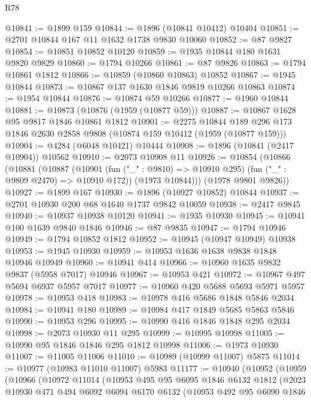 \begin{lexlean}{R78}
\begin{coremodule}
@10841 := @1899 @159
@10844 := @1896 (@10841 @10412) @10404
@10851 := @2701 @10844 @167 @11 @1632 @1738 @9830 @10060
@10852 := @87 @9827
@10854 := @10851 @10852 @10120
@10859 := @1935 @10844 @180 @1631 @9820 @9829
@10860 := @1794 @10266
@10861 := @87 @9826
@10863 := @1794 @10861 @1812
@10866 := @10859 (@10860 @10863) @10852
@10867 := @1945 @10844
@10873 := @10867 @137 @1630 @1846 @9819 @10266 @10863
@10874 := @1954 @10844
@10876 := @10874 @59 @10266
@10877 := @1960 @10844
@10881 := @10873 (@10876 (@1959 (@10877 @59)))
@10887 := @10867 @1628 @95 @9817 @1846 @10861 @1812
@10901 := @2275
    @10844
    @189
    @296
    @173
    @1846
    @2630
    @2858
    @9808
    (@10874 @159 @10412 (@1959 (@10877 @159)))
@10904 := @4284 (@6048 @10421) @10444
@10908 := @1896 (@10841 (@2417 @10904)) @10562
@10910 := @2073 @10908 @11
@10926 := @10854
    (@10866
      (@10881
        (@10887
          (@10901 (fun ("_" : @9810) => @10910 @295) (fun ("_" : @9809 @2470) => @10910 @172))
          (@1973 @10844)))
      (@1978 @9801 @9826))
@10927 := @1899 @167
@10930 := @1896 (@10927 @10852) @10844
@10937 := @2701 @10930 @200 @68 @1640 @1737 @9842 @10059
@10938 := @2417 @9845
@10940 := @10937 @10938 @10120
@10941 := @1935 @10930
@10945 := @10941 @100 @1639 @9840 @1846
@10946 := @87 @9835
@10947 := @1794 @10946
@10949 := @1794 @10852 @1812
@10952 := @10945 (@10947 @10949) @10938
@10953 := @1945 @10930
@10959 := @10953 @1636 @1638 @9838 @1848 @10946 @10949
@10960 := @10941 @414
@10966 := @10960 @1635 @9832 @9837 (@5958 @7017) @10946
@10967 := @10953 @421
@10972 := @10967 @497 @5694 @6937 @5957 @7017
@10977 := @10960 @420 @5688 @5693 @5971 @5957
@10978 := @10953 @418
@10983 := @10978 @416 @5686 @1848 @5846 @2034
@10984 := @10941 @180
@10989 := @10984 @417 @1849 @5685 @5863 @5846
@10990 := @10953 @296
@10995 := @10990 @416 @1846 @1848 @295 @2034
@10998 := @2073 @10930 @11 @295
@10999 := @10995 @10998
@11005 := @10990 @95 @1846 @1846 @295 @1812 @10998
@11006 := @1973 @10930
@11007 := @11005 @11006
@11010 := @10989 (@10999 @11007) @5875
@11014 := @10977 (@10983 @11010 @11007) @5983
@11177 := @10940
    (@10952
      (@10959
        (@10966
          (@10972
            @11014
            (@10953
              @495
              @95
              @6095
              @1846
              @6132
              @1812
              (@2023
                @10930
                @471
                @494
                @6092
                @6094
                @6170
                @6132
                (@10953
                  @492
                  @95
                  @6090
                  @1846

\end{coremodule}
\end{lexlean}
